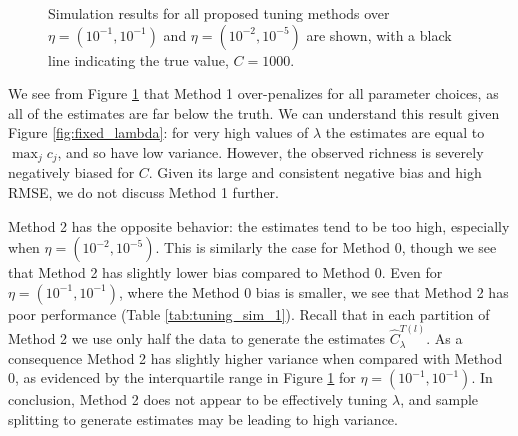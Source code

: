 \documentclass[12pt]{article}
\theoremstyle{break}
\theoremstyle{break}
\begin{document}
\begin{figure}[t]
\caption{Simulation results for all proposed tuning methods over $\eta = (10^{-1}, 10^{-1})$ and $\eta = (10^{-2}, 10^{-5})$ are shown, with a black line indicating the true value, $C = 1000$.
\label{fig:tuning_sim_1}}
\centering{}
\end{figure}

We see from Figure \ref{fig:tuning_sim_1} that Method 1 over-penalizes for all parameter choices, as all of the estimates are far below the truth. We can understand this result given Figure \ref{fig:fixed_lambda}: for very high values of $\lambda$ the estimates are equal to $\max_j c_j$, and so have low variance. However, the observed richness is severely negatively biased for $C$. Given its large and consistent negative bias and high RMSE, we do not discuss  Method 1 further.

Method 2 has the opposite behavior: the estimates tend to be too high, especially when $\eta = (10^{-2}, 10^{-5})$. This is similarly the case for Method 0, though we see that Method 2 has slightly lower bias compared to Method 0.  %
Even for $\eta = (10^{-1}, 10^{-1})$, where the Method 0 bias is smaller, we see that Method 2 has poor performance (Table \ref{tab:tuning_sim_1}).  Recall that in each partition of Method 2 we use only half the data to generate the estimates $\widehat{C}^{T(l)}_{\lambda}$.  As a consequence Method 2 has slightly higher variance when compared with Method 0, as evidenced by the interquartile range in Figure \ref{fig:tuning_sim_1} for $\eta = (10^{-1}, 10^{-1})$.  In conclusion, Method 2 does not appear to be effectively
tuning $\lambda$, and sample splitting to generate estimates may be leading to high variance.
\end{document}

